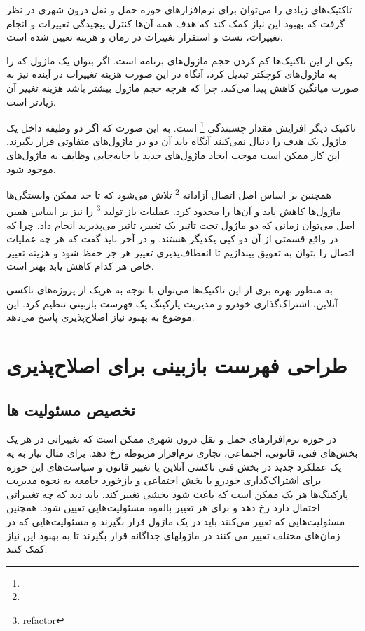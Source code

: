  تاکتیک‌های زیادی را می‌توان برای نرم‌افزار‌های حوزه حمل و‌ نقل درون شهری در نظر گرفت که بهبود این نیاز کمک کند که هدف همه آن‌ها کنترل پیچیدگی تغییرات و انجام تغییرات، تست و استقرار تغییرات در زمان و هزینه تعیین شده است.

یکی از این تاکتیک‌ها کم کردن حجم ماژول‌های برنامه است. اگر بتوان یک ماژول که را به ماژول‌های کوچکتر تبدیل کرد، آنگاه در این صورت هزینه تغییرات در آینده نیز به صورت میانگین کاهش پیدا می‌کند.
چرا که هرچه حجم ماژول بیشتر باشد هزینه تغییر آن زیادتر است.

تاکتیک دیگر افزایش مقدار چسبندگی
\footnote{}
است. به این صورت که اگر دو وظیفه داخل یک ماژول یک هدف را دنبال نمی‌کنند آنگاه باید آن دو در ماژول‌های متفاوتی قرار بگیرند.
این کار ممکن است موجب ایجاد ماژول‌های جدید یا جابه‌جایی وظایف به ماژول‌های موجود شود.

همچنین بر اساس اصل اتصال آزادانه
\footnote{} 
تلاش می‌شود که تا حد ممکن وابستگی‌ها ماژول‌ها کاهش یاید و آن‌ها را محدود کرد. عملیات باز تولید
\footnote{refactor}
را نیز بر اساس همین اصل می‌توان زمانی که دو ماژول تحت تاثیر یک تغییر، تاثیر می‌پذیرند انجام داد. چرا که در واقع قسمتی از آن دو کپی یکدیگر هستند.
و در آخر باید گفت که هر چه عملیات اتصال را بتوان به تعویق بیندازیم تا انعطاف‌پذیری تغییر هر جز حفظ شود و هزینه تغییر خاص هر کدام کاهش یابد بهتر است.


به منظور بهره بری از این تاکتیک‌ها می‌توان با توجه به هریک از پروژه‌های تاکسی آنلاین، اشتراک‌گذاری خودرو و مدیریت پارکینگ یک فهرست بازبینی تنظیم کرد. این موضوع به بهبود نیاز اصلاح‌پذیری پاسخ می‌دهد.

\section{طراحی فهرست بازبینی برای اصلا‌ح‌پذیری}
\subsection{تخصیص مسئولیت ها} 
در حوزه نرم‌افزارهای حمل و نقل درون شهری ممکن است که تغییراتی در هر یک بخش‌های فنی، قانونی، اجتماعی، تجاری نرم‌افزار مربوطه رخ دهد. برای مثال نیاز به یه یک عملکرد جدید در بخش فنی تاکسی آنلاین یا تغییر قانون و سیاست‌های این حوزه برای اشتراک‌گذاری خودرو یا بخش اجتماعی و بازخورد جامعه به نحوه مدیریت پارکینگ‌ها هر یک ممکن است که باعث شود بخشی تغییر کند. 
باید دید که چه تغییراتی احتمال دارد رخ دهد و برای هر تغییر بالقوه مسئولیت‌هایی تعیین شود. 
همچنین مسئولیت‌هایی که تغییر می‌کنند باید در یک ماژول قرار بگیرند و مسئولیت‌هایی که در زمان‌های مختلف تغییر می کنند در ماژولهای جداگانه قرار بگیرند تا به بهبود این نیاز کمک کنند.

